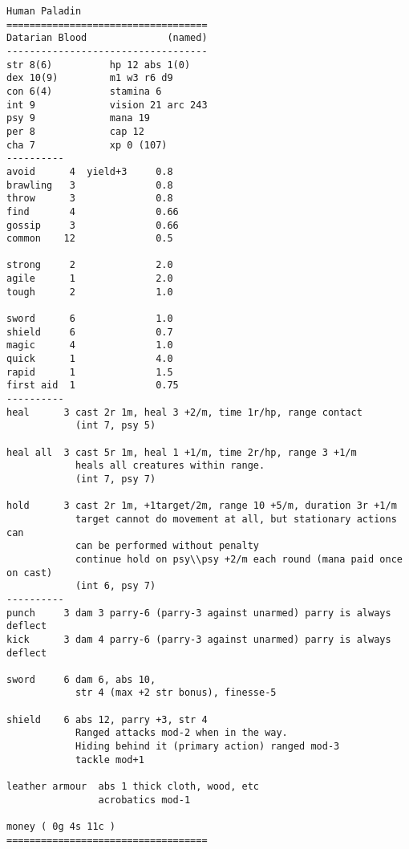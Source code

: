 \goodbreak
\tiny \begin{samepage} \begin{verbatim}
Human Paladin
===================================
Datarian Blood              (named)
-----------------------------------
str 8(6)          hp 12 abs 1(0)
dex 10(9)         m1 w3 r6 d9
con 6(4)          stamina 6
int 9             vision 21 arc 243
psy 9             mana 19
per 8             cap 12
cha 7             xp 0 (107)
----------
avoid      4  yield+3     0.8
brawling   3              0.8
throw      3              0.8
find       4              0.66
gossip     3              0.66
common    12              0.5

strong	   2              2.0
agile	   1              2.0
tough	   2              1.0

sword	   6              1.0
shield	   6              0.7
magic	   4              1.0
quick      1              4.0
rapid	   1              1.5
first aid  1              0.75
----------
heal	  3 cast 2r 1m, heal 3 +2/m, time 1r/hp, range contact
            (int 7, psy 5)

heal all  3 cast 5r 1m, heal 1 +1/m, time 2r/hp, range 3 +1/m
            heals all creatures within range.
            (int 7, psy 7)

hold	  3 cast 2r 1m, +1target/2m, range 10 +5/m, duration 3r +1/m
            target cannot do movement at all, but stationary actions can
            can be performed without penalty
            continue hold on psy\\psy +2/m each round (mana paid once on cast)
            (int 6, psy 7)
----------
punch     3 dam 3 parry-6 (parry-3 against unarmed) parry is always deflect
kick      3 dam 4 parry-6 (parry-3 against unarmed) parry is always deflect

sword     6 dam 6, abs 10,
            str 4 (max +2 str bonus), finesse-5

shield    6 abs 12, parry +3, str 4
            Ranged attacks mod-2 when in the way.
            Hiding behind it (primary action) ranged mod-3
            tackle mod+1

leather armour  abs 1 thick cloth, wood, etc
                acrobatics mod-1

money ( 0g 4s 11c )
===================================
\end{verbatim} \end{samepage} \normalsize


\

